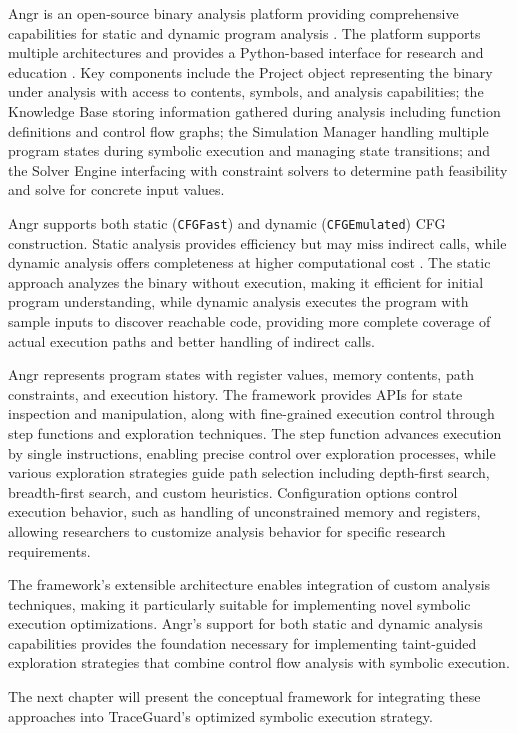 Angr is an open-source binary analysis platform providing comprehensive capabilities for static and dynamic program analysis \cite{shoshitaishvili_sok_2016}. The platform supports multiple architectures and provides a Python-based interface for research and education \cite{springer_teaching_2018}. Key components include the Project object representing the binary under analysis with access to contents, symbols, and analysis capabilities; the Knowledge Base storing information gathered during analysis including function definitions and control flow graphs; the Simulation Manager handling multiple program states during symbolic execution and managing state transitions; and the Solver Engine interfacing with constraint solvers to determine path feasibility and solve for concrete input values.

Angr supports both static (\texttt{CFGFast}) and dynamic (\texttt{CFGEmulated}) CFG construction. Static analysis provides efficiency but may miss indirect calls, while dynamic analysis offers completeness at higher computational cost \cite{angr_documentation}. The static approach analyzes the binary without execution, making it efficient for initial program understanding, while dynamic analysis executes the program with sample inputs to discover reachable code, providing more complete coverage of actual execution paths and better handling of indirect calls.

Angr represents program states with register values, memory contents, path constraints, and execution history. The framework provides APIs for state inspection and manipulation, along with fine-grained execution control through step functions and exploration techniques. The step function advances execution by single instructions, enabling precise control over exploration processes, while various exploration strategies guide path selection including depth-first search, breadth-first search, and custom heuristics. Configuration options control execution behavior, such as handling of unconstrained memory and registers, allowing researchers to customize analysis behavior for specific research requirements.

The framework's extensible architecture enables integration of custom analysis techniques, making it particularly suitable for implementing novel symbolic execution optimizations. Angr's support for both static and dynamic analysis capabilities provides the foundation necessary for implementing taint-guided exploration strategies that combine control flow analysis with symbolic execution.

The next chapter will present the conceptual framework for integrating these approaches into TraceGuard's optimized symbolic execution strategy.
